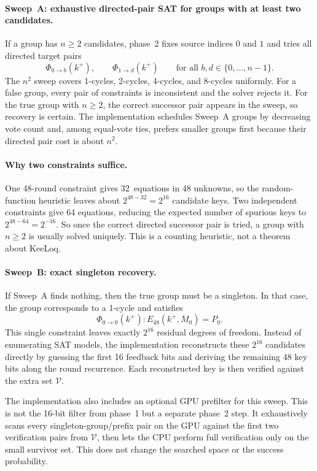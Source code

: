\documentclass[version=preprint]{iacrcc}
\begin{document}
\paragraph{Sweep~A: exhaustive directed-pair SAT for groups with at least two candidates.}
If a group has $n \geq 2$ candidates, phase~2 fixes source indices $0$ and $1$ and tries all directed target pairs
\[
\Phi_{0 \to b}(k^{+}),\qquad \Phi_{1 \to d}(k^{+})
\qquad\text{for all } b,d \in \{0,\dots,n-1\}.
\]
The $n^2$ sweep covers 1-cycles, 2-cycles, 4-cycles, and 8-cycles uniformly.
For a false group, every pair of constraints is inconsistent and the solver rejects it.
For the true group with $n \geq 2$, the correct successor pair appears in the sweep, so recovery is certain.
The implementation schedules Sweep~A groups by decreasing vote count and, among equal-vote ties, prefers smaller groups first because their directed pair cost is about $n^2$.

\paragraph{Why two constraints suffice.}
One 48-round constraint gives 32~equations in 48 unknowns, so the random-function heuristic leaves about $2^{48-32}=2^{16}$ candidate keys.
Two independent constraints give 64 equations, reducing the expected number of spurious keys to $2^{48-64}=2^{-16}$.
So once the correct directed successor pair is tried, a group with $n \ge 2$ is usually solved uniquely.
This is a counting heuristic, not a theorem about KeeLoq.

\paragraph{Sweep~B: exact singleton recovery.}
If Sweep~A finds nothing, then the true group must be a singleton.
In that case, the group corresponds to a 1-cycle and satisfies
\[
\Phi_{0 \to 0}(k^{+}) : E_{48}(k^{+}, M_0) = P_0.
\]
This single constraint leaves exactly $2^{16}$ residual degrees of freedom.
Instead of enumerating SAT models, the implementation reconstructs these $2^{16}$ candidates directly by guessing the first 16 feedback bits and deriving the remaining 48 key bits along the round recurrence.
Each reconstructed key is then verified against the extra set $\mathcal{V}$.

The implementation also includes an optional GPU prefilter for this sweep.
This is not the 16-bit filter from phase~1 but a separate phase~2 step.
It exhaustively scans every singleton-group/prefix pair on the GPU against the first two verification pairs from $\mathcal{V}$, then lets the CPU perform full verification only on the small survivor set.
This does not change the searched space or the success probability.
\end{document}

